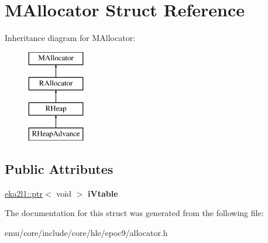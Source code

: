 \hypertarget{struct_m_allocator}{}\section{M\+Allocator Struct Reference}
\label{struct_m_allocator}
Inheritance diagram for M\+Allocator\+:\begin{figure}[H]
\begin{center}
\leavevmode
\includegraphics[height=4.000000cm]{struct_m_allocator}
\end{center}
\end{figure}
\subsection*{Public Attributes}
\begin{DoxyCompactItemize}
\item 
\mbox{\label{struct_m_allocator_a0e244a5f494cee2d2a0b6d4243925dd2}} 
\mbox{\hyperlink{classeka2l1_1_1ptr}{eka2l1\+::ptr}}$<$ void $>$ {\bfseries i\+Vtable}
\end{DoxyCompactItemize}


The documentation for this struct was generated from the following file\+:\begin{DoxyCompactItemize}
\item 
emu/core/include/core/hle/epoc9/allocator.\+h\end{DoxyCompactItemize}
